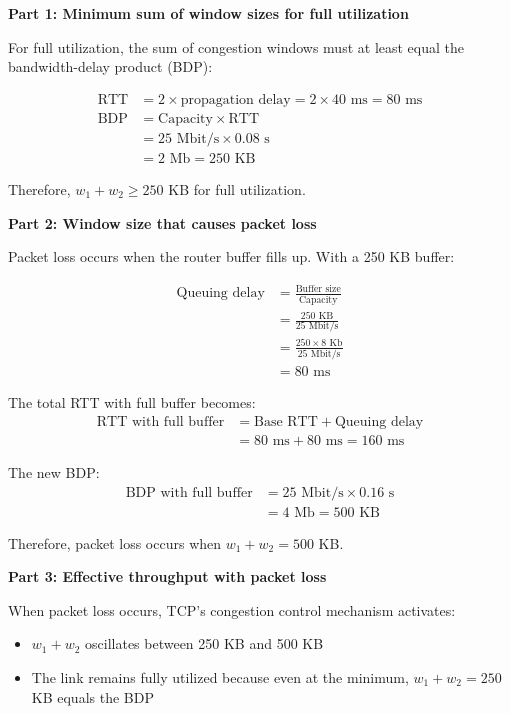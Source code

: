\documentclass[11pt,a4paper]{article}
\begin{document}
\textbf{Part 1: Minimum sum of window sizes for full utilization}

For full utilization, the sum of congestion windows must at least equal the bandwidth-delay product (BDP):

\begin{align}
\text{RTT} &= 2 \times \text{propagation delay} = 2 \times 40 \text{ ms} = 80 \text{ ms}\\
\text{BDP} &= \text{Capacity} \times \text{RTT}\\
&= 25 \text{ Mbit/s} \times 0.08 \text{ s}\\
&= 2 \text{ Mb} = 250 \text{ KB}
\end{align}

Therefore, $w_1 + w_2 \geq 250$ KB for full utilization.

\textbf{Part 2: Window size that causes packet loss}

Packet loss occurs when the router buffer fills up. With a 250 KB buffer:

\begin{align}
\text{Queuing delay} &= \frac{\text{Buffer size}}{\text{Capacity}}\\
&= \frac{250 \text{ KB}}{25 \text{ Mbit/s}}\\
&= \frac{250 \times 8 \text{ Kb}}{25 \text{ Mbit/s}}\\
&= 80 \text{ ms}
\end{align}

The total RTT with full buffer becomes:
\begin{align}
\text{RTT with full buffer} &= \text{Base RTT} + \text{Queuing delay}\\
&= 80 \text{ ms} + 80 \text{ ms} = 160 \text{ ms}
\end{align}

The new BDP:
\begin{align}
\text{BDP with full buffer} &= 25 \text{ Mbit/s} \times 0.16 \text{ s}\\
&= 4 \text{ Mb} = 500 \text{ KB}
\end{align}

Therefore, packet loss occurs when $w_1 + w_2 = 500$ KB.

\textbf{Part 3: Effective throughput with packet loss}

When packet loss occurs, TCP's congestion control mechanism activates:
\begin{itemize}
    \item $w_1 + w_2$ oscillates between 250 KB and 500 KB
    \item The link remains fully utilized because even at the minimum, $w_1 + w_2 = 250$ KB equals the BDP
\end{itemize}
\end{document}

